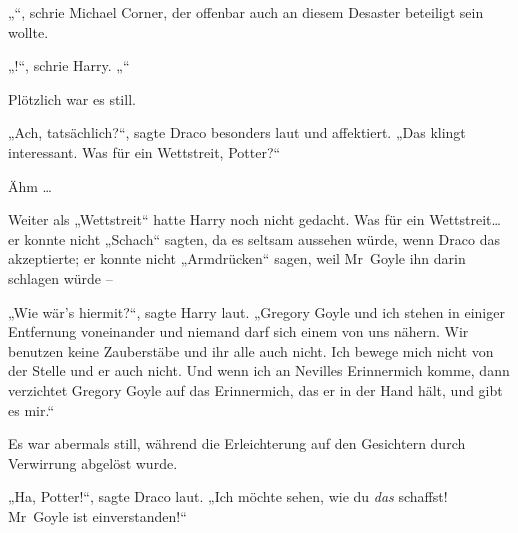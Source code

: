 „“, schrie Michael Corner, der offenbar auch an diesem Desaster beteiligt sein wollte.

„!“, schrie Harry. „“

Plötzlich war es still.

„Ach, tatsächlich?“, sagte Draco besonders laut und affektiert. „Das klingt interessant. Was für ein Wettstreit, Potter?“

Ähm …

Weiter als „Wettstreit“ hatte Harry noch nicht gedacht. Was für ein Wettstreit…er konnte nicht „Schach“ sagten, da es seltsam aussehen würde, wenn Draco das akzeptierte; er konnte nicht „Armdrücken“ sagen, weil Mr~Goyle ihn darin schlagen würde –

„Wie wär’s hiermit?“, sagte Harry laut. „Gregory Goyle und ich stehen in einiger Entfernung voneinander und niemand darf sich einem von uns nähern. Wir benutzen keine Zauberstäbe und ihr alle auch nicht. Ich bewege mich nicht von der Stelle und er auch nicht. Und wenn ich an Nevilles Erinnermich komme, dann verzichtet Gregory Goyle auf das Erinnermich, das er in der Hand hält, und gibt es mir.“

Es war abermals still, während die Erleichterung auf den Gesichtern durch Verwirrung abgelöst wurde.

„Ha, Potter!“, sagte Draco laut. „Ich möchte sehen, wie du \emph{das} schaffst! Mr~Goyle ist einverstanden!“

